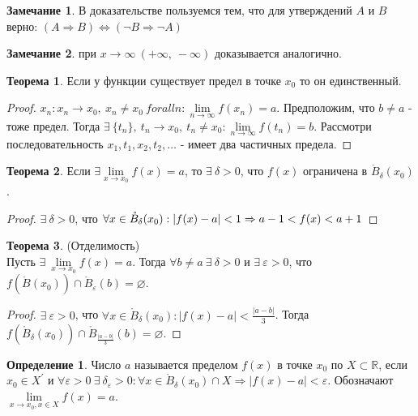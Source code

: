 \documentclass[a4paper, 12pt]{article}
\newcommand{\R}{\mathbb{R}}
\newcommand{\Bo}{\mathring{B}}
\renewcommand{\epsilon}{\varepsilon}
\renewcommand{\emptyset}{\varnothing}
\newcommand{\lims}{\lim\limits_{n\to \infty}}
\theoremstyle{definition}
\newtheorem*{definition}{Определение}
\newtheorem*{theorem}{Теорема}
\newtheorem*{comm}{Замечание}
\begin{document}
        \begin{comm}
            В доказательстве пользуемся тем, что для утверждений $A$ и $B$ верно: $(A\Rightarrow B) \Leftrightarrow (\lnot B\Rightarrow \lnot A)$
        \end{comm} 
        \begin{comm}
            при $x\to \infty\ (+\infty,\ -\infty)$ доказывается аналогично.
        \end{comm}
        \begin{theorem}
            Если у функции существует предел в точке $x_0$ то он единственный.
        \end{theorem}
        \begin{proof}
            $x_n: x_n\to x_0,\ x_n\ne x_0\ forall n: \lims f(x_n)=a$. Предположим, что $b\ne a$ - тоже предел. Тогда $\exists\ \{t_n\},\ t_n\to x_0,\ t_n\ne x_0: \lims f(t_n)=b$. Рассмотри последовательность $x_1,t_1,x_2,t_2,\dots$ - имеет два частичных предела.
        \end{proof}
        \begin{theorem}
            Если $\exists \lim\limits_{x\to x_0}f(x)=a$, то $\exists\ \delta>0$, что $f(x)$ ограничена в $\Bo_{\delta}(x_0)$.
        \end{theorem} 
        \begin{proof}
            $\exists\ \delta>0$, что $\forall x\in \Bo_{\delta}(x_0): |f(x)-a|<1\\
            \Rightarrow a-1<f(x)<a+1$
        \end{proof}
        \begin{theorem} (Отделимость)\\
            Пусть $\exists\ \lim\limits_{x\to x_0}f(x)=a$. Тогда $\forall b\ne a\ \exists\ \delta>0$ и $\exists\ \epsilon>0$, что $f(\Bo(x_0))\cap \Bo_\epsilon(b)=\emptyset$. 
        \end{theorem}  
        \begin{proof}
            $\exists\ \epsilon>0$, что $\forall x\in \Bo_{\delta}(x_0): |f(x)-a|<\frac{|a-b|}{3}$. Тогда\\
            $f(\Bo_{\delta}(x_0))\cap\Bo_{\frac{|a-b|}{3}}(b)=\emptyset$.
        \end{proof} 
        \begin{definition}
            Число $a$ называется пределом $f(x)$ в точке $x_0$ по $X\subset \R$, если $x_0\in X^{\prime}$ и $\forall\epsilon>0\ \exists\ \delta_{\epsilon}>0: \forall x\in \Bo_{\delta}(x_0)\cap X \Rightarrow |f(x)-a|<\epsilon$. Обозначают $\lim\limits_{x\to x_0,x\in X}f(x)=a$.
        \end{definition} 
\end{document}
